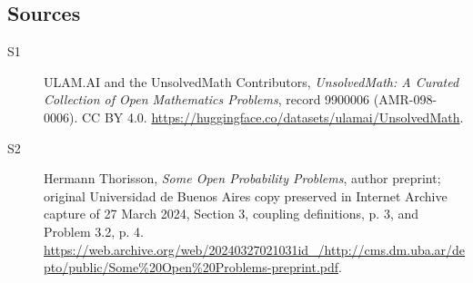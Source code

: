 \documentclass[11pt]{article}
\begin{document}
\subsection{Sources}
\begin{description}
\item[\hypertarget{source:9900006:1}{S1}] ULAM.AI and the UnsolvedMath Contributors, \emph{UnsolvedMath: A Curated Collection of Open Mathematics Problems}, record 9900006 (AMR-098-0006). CC BY 4.0. \url{https://huggingface.co/datasets/ulamai/UnsolvedMath}.
\item[\hypertarget{source:9900006:2}{S2}] Hermann Thorisson, \emph{Some Open Probability Problems}, author preprint; original Universidad de Buenos Aires copy preserved in Internet Archive capture of 27 March 2024, Section 3, coupling definitions, p. 3, and Problem 3.2, p. 4. \url{https://web.archive.org/web/20240327021031id_/http://cms.dm.uba.ar/depto/public/Some%20Open%20Problems-preprint.pdf}.
\end{description}
\label{end:9900006}
\end{document}
